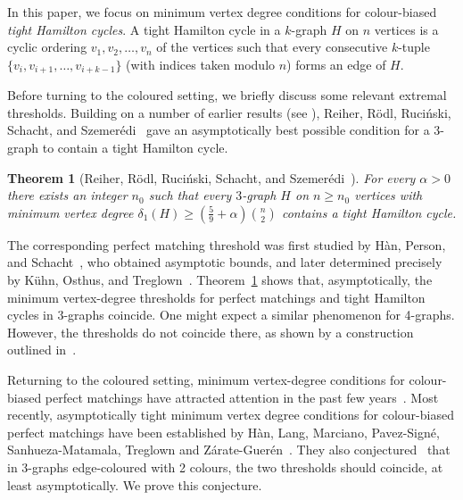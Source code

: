 \documentclass[A4paper,12pt]{article}
\newtheorem{thm}{Theorem}[section]
\theoremstyle{definition}
\begin{document}
In this paper, we focus on minimum vertex degree conditions for colour-biased \emph{tight Hamilton cycles}. A tight Hamilton cycle in a $k$-graph $H$ on $n$ vertices is a cyclic ordering 
$v_1, v_2, \ldots, v_n$ of the vertices such that every consecutive $k$-tuple $\{v_i, v_{i+1}, \ldots, v_{i+k-1}\}$
(with indices taken modulo $n$) forms an edge of $H$.

Before turning to the coloured setting, we briefly discuss some relevant extremal thresholds. Building on a number of earlier results (see \cite{GlebovPersonWeps2012,RodlRucinski2014,RodlRucinskiSchachtSzemeredi2017}), Reiher, R\"odl, Ruci\'nski, Schacht, and Szemer\'edi~\cite{3hamcycle} gave an asymptotically best possible condition for a $3$-graph to contain a tight Hamilton cycle. 
\begin{thm}[Reiher, R\"odl, Ruci\'nski, Schacht, and Szemer\'edi~\cite{3hamcycle}]\label{thm:hamcyclenocolour}
For every $\alpha>0$ there exists an integer $n_0$ such that every $3$-graph $H$ on $n\geq n_0$ vertices with minimum vertex degree $\delta_1(H) \ge \left(\frac{5}{9} + \alpha\right) \binom{n}{2}$
contains a tight Hamilton cycle. 
\end{thm}

The corresponding perfect matching threshold was first studied by H\`an, Person, and Schacht~\cite{HPS09}, who obtained asymptotic bounds, and later determined precisely by K\"uhn, Osthus, and Treglown~\cite{KOT10}. Theorem~\ref{thm:hamcyclenocolour} shows that, asymptotically, the minimum vertex-degree thresholds for perfect matchings and tight Hamilton cycles in $3$-graphs coincide. One might expect a similar phenomenon for 4-graphs. However, the thresholds do not coincide there, as shown by a construction outlined in~\cite[Section 5.2]{color-bias25}. 

Returning to the coloured setting, minimum vertex-degree conditions for colour-biased perfect matchings have attracted attention in the past few years~\cite{BTZ24, color-bias25, LMX26}. Most recently, asymptotically tight minimum vertex degree conditions for colour-biased perfect matchings have been established by H\`an,  Lang, Marciano, Pavez-Sign\'e,  Sanhueza-Matamala, Treglown and Z\'arate-Guer\'en~\cite{color-bias25}. They also
conjectured~\cite[Conjecture 5.1]{color-bias25} that in 3-graphs edge-coloured with 2 colours, the two thresholds should coincide, at least asymptotically. We prove this conjecture.
\end{document}
